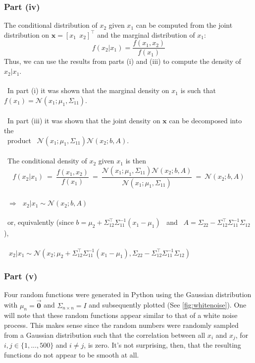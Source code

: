 \documentclass[twoside,11pt]{homework}
\DeclarePairedDelimiter{\2norm}{\lVert}{\rVert^2_2}
\newcommand{\1}[1]{\mathds{1}\left[#1\right]}
\begin{document}
\subsubsection*{Part (iv)}
The conditional distribution of $x_2$ given $x_1$ can be computed from the joint distribution on $\textbf{x} = [x_1 \  \ x_2]^{\top}$ and the marginal distribution of $x_1$: $$f(x_2 \vert x_1) = \frac{f(x_1, x_2)}{f(x_1)}$$
Thus, we can use the results from parts (i) and (iii) to compute the density of $x_2 \vert x_1$.\\\ \\\
In part (i) it was shown that the marginal density on $x_1$ is such that $f(x_1) = \mathcal{N}(x_1; \mu_1, \Sigma_{11})$.\\\ \\\
In part (iii) it was shown that the joint density on $\textbf{x}$ can be decomposed into the \\\ 
product \ $\mathcal{N}(x_1; \mu_1, \Sigma_{11})\mathcal{N}(x_2; b, A)$. \\\ \\\
The conditional density of $x_2$ given $x_1$ is then 
$$f(x_2 \vert x_1) \ = \ \frac{f(x_1, x_2)}{f(x_1)} \ = \ \frac{\mathcal{N}(x_1; \mu_1, \Sigma_{11})\mathcal{N}(x_2; b, A)}{\mathcal{N}(x_1; \mu_1, \Sigma_{11})} \ = \ \mathcal{N}(x_2; b, A)$$ \\\ 
$\Longrightarrow \ \ \ x_2 \vert x_1 \sim \mathcal{N}(x_2; b, A)$ \\\ \\\
or, equivalently (since $b = \mu_2 + \Sigma_{12}^{\top}\Sigma_{11}^{-1}(x_1 - \mu_1)$ \ and \ $A = \Sigma_{22} - \Sigma_{12}^{\top}\Sigma_{11}^{-1}\Sigma_{12}$),\\\ \\\
$\ x_2 \vert x_1 \sim \mathcal{N}\left(x_2; \mu_2 + \Sigma_{12}^{\top}\Sigma_{11}^{-1}(x_1 - \mu_1), \Sigma_{22} - \Sigma_{12}^{\top}\Sigma_{11}^{-1}\Sigma_{12}\right)  $  \ \ \ \ \ \ \ \ \

\newpage

\subsubsection*{Part (v)}
Four random functions were generated in Python using the Gaussian distribution with $\mu_n = \bm{\vec{0}}$ and $\Sigma_{n \times n} = I$ and subsequently plotted (See \autoref{fig:whitenoise}). One will note that these random functions appear similar to that of a white noise process. This makes sense since the random numbers were randomly sampled from a Gaussian distribution such that the correlation between all $x_i$ and $x_j$, for $i, j \in \{1,...,500\} $ and $i \neq  j$, is zero. It's not surprising, then, that the resulting functions do not appear to be smooth at all. 
\end{document}
